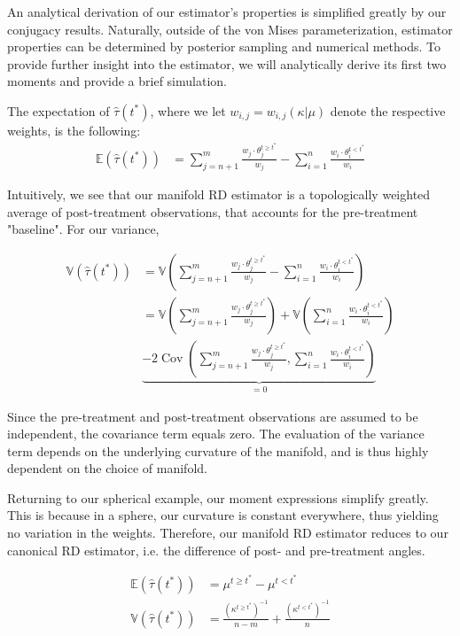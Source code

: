 \documentclass[twoside,11pt]{article}
\begin{document}
An analytical derivation of our estimator's properties is simplified greatly by our conjugacy results. Naturally, outside of the von Mises parameterization, estimator properties can be determined by posterior sampling and numerical methods. To provide further insight into the estimator, we will analytically derive its first two moments and provide a brief simulation. 

The expectation of $\hat{\tau}(t^*)$, where we let $w_{i,j} = w_{i,j}(\kappa|\mu)$ denote the respective weights, is the following:
\[
  \begin{aligned}
    \mathbb{E}(\hat{\tau}(t^*)) &= \sum_{j=n+1}^{m} \frac{w_j \cdot \theta_j^{t \geq t^*}}{w_j} - \sum_{i=1}^{n} \frac{w_i \cdot \theta_i^{t < t^*}}{w_i}
  \end{aligned}
\]

Intuitively, we see that our manifold RD estimator is a topologically weighted average of post-treatment observations, that accounts for the pre-treatment "baseline". For our variance, 

$$
\begin{aligned}
\mathbb{V}(\hat{\tau}(t^*)) &= \mathbb{V}\left(\sum_{j=n+1}^{m} \frac{w_j \cdot \theta_j^{t \geq t^*}}{w_j} - \sum_{i=1}^{n} \frac{w_i \cdot \theta_i^{t < t^*}}{w_i}\right) \\
                            &= \mathbb{V}\left(\sum_{j=n+1}^{m} \frac{w_j \cdot \theta_j^{t \geq t^*}}{w_j}\right) + \mathbb{V}\left(\sum_{i=1}^{n} \frac{w_i \cdot \theta_i^{t < t^*}}{w_i}\right) \\
                            &\underbrace{- 2\operatorname{Cov}\left(\sum_{j=n+1}^{m} \frac{w_j \cdot \theta_j^{t \geq t^*}}{w_j}, \sum_{i=1}^{n} \frac{w_i \cdot \theta_i^{t < t^*}}{w_i}\right)}_{=0}
\end{aligned}
$$

Since the pre-treatment and post-treatment observations are assumed to be independent, the covariance term equals zero. The evaluation of the variance term depends on the underlying curvature of the manifold, and is thus highly dependent on the choice of manifold.

Returning to our spherical example, our moment expressions simplify greatly. This is because in a sphere, our curvature is constant everywhere, thus yielding no variation in the weights. Therefore, our manifold RD estimator reduces to our canonical RD estimator, i.e. the difference of post- and pre-treatment angles. 

$$
\begin{aligned}
  \mathbb{E}(\hat{\tau}(t^*)) &= \mu^{t \geq t^*} - \mu^{t < t^*} \\ 
  \mathbb{V}(\hat{\tau}(t^*)) &= \frac{(\kappa^{t \geq t^*})^{-1}}{n-m} + \frac{(\kappa^{t < t^*})^{-1}}{n} 
\end{aligned}
$$
\end{document}
